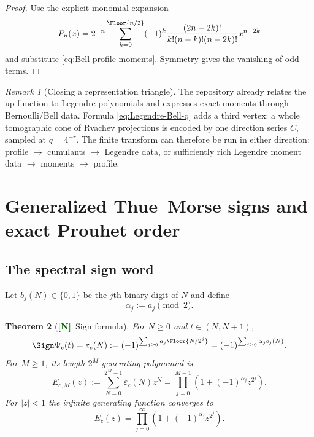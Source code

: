 \documentclass[11pt]{article}
\numberwithin{equation}{section}
\newtheorem{theorem}{Theorem}[section]
\theoremstyle{definition}
\theoremstyle{remark}
\newtheorem{remark}[theorem]{Remark}
\newcommand{\New}{\textcolor{darkgreen}{\textsf{\textbf{[N]}}}}
\begin{document}
\begin{proof}
Use the explicit monomial expansion
\[
 P_n(x)=2^{-n}\sum_{k=0}^{\Floor{n/2}}(-1)^k
 \frac{(2n-2k)!}{k!(n-k)!(n-2k)!}x^{n-2k}
\]
and substitute \eqref{eq:Bell-profile-moments}.  Symmetry gives the vanishing
of odd terms.
\end{proof}

\begin{remark}[Closing a representation triangle]
The repository already relates the up-function to Legendre polynomials and
expresses exact moments through Bernoulli/Bell data.  Formula
\eqref{eq:Legendre-Bell-q} adds a third vertex: a whole tomographic cone of
Rvachev projections is encoded by one direction series $C$, sampled at
$q=4^{-r}$.  The finite transform can therefore be run in either direction:
profile $\to$ cumulants $\to$ Legendre data, or sufficiently rich Legendre
moment data $\to$ moments $\to$ profile.
\end{remark}

\section{Generalized Thue--Morse signs and exact Prouhet order}
\label{sec:signs}

\subsection{The spectral sign word}

Let $b_j(N)\in\{0,1\}$ be the $j$th binary digit of $N$ and define
\begin{equation}
 \alpha_j:=a_j\pmod2.
 \label{eq:alpha}
\end{equation}

\begin{theorem}[\New\ Sign formula]
\label{thm:sign-formula}
For $N\ge0$ and $t\in(N,N+1)$,
\begin{equation}
 \Sign \Psi_c(t)
 =\varepsilon_c(N)
 :=(-1)^{\sum_{j\ge0}a_j\Floor{N/2^j}}
 =(-1)^{\sum_{j\ge0}\alpha_jb_j(N)}.
 \label{eq:sign-formula}
\end{equation}
For $M\ge1$, its length-$2^M$ generating polynomial is
\begin{equation}
 E_{c,M}(z)
 :=\sum_{N=0}^{2^M-1}\varepsilon_c(N)z^N
 =\prod_{j=0}^{M-1}\left(1+(-1)^{\alpha_j}z^{2^j}\right).
 \label{eq:sign-polynomial}
\end{equation}
For $|z|<1$ the infinite generating function converges to
\begin{equation}
 E_c(z)=\prod_{j=0}^{\infty}
 \left(1+(-1)^{\alpha_j}z^{2^j}\right).
 \label{eq:sign-infinite-product}
\end{equation}
\end{theorem}
\end{document}

